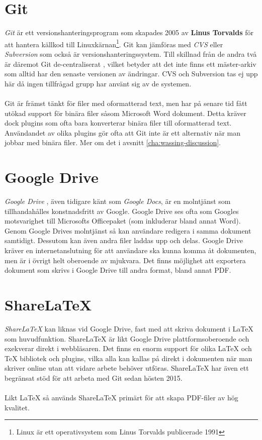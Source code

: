\section{Git}
\label{sec:wassing-git}
\textit{Git} \cite{website:git} är ett versionshanteringsprogram \cite{website:git_version_control} som skapades 2005 av \textbf{Linus Torvalds} för att hantera källkod till Linuxkärnan\footnote{Linux är ett operativsystem som Linus Torvalds publicerade 1991}. Git kan jämföras med \textit{CVS} eller \textit{Subversion} som också är versionshanteringssystem. Till skillnad från de andra två är däremot Git de-centraliserat \cite{website:centralized_version_control}, vilket betyder att det inte finns ett mäster-arkiv som alltid har den senaste versionen av ändringar. CVS och Subversion tas ej upp här då ingen tillfrågad grupp har använt sig av de systemen.
\\ \\
Git är främst tänkt för filer med oformatterad text, men har på senare tid fått utökad support för binära filer såsom Microsoft Word dokument. Detta kräver dock plugins som ofta bara konverterar binära filer till oformatterad text. \cite{website:using_git_with_word} Användandet av olika plugins gör ofta att Git inte är ett alternativ när man jobbar med binära filer. Mer om det i avsnitt \ref{cha:wassing-discussion}.

\section{Google Drive}
\textit{Google Drive} \cite{website:googledrive}, även tidigare känt som \textit{Google Docs}, är en molntjänst som tillhandahålles konstnadsfritt av Google. Google Drive ses ofta som Googles motsvarighet till Microsofts Officepaket (som inkluderar bland annat Word). Genom Google Drives molntjänst så kan användare redigera i samma dokument samtidigt. Dessutom kan även andra filer laddas upp och delas. Google Drive kräver en internetanslutning för att användare ska kunna komma åt dokumenten, men är i övrigt helt oberoende av mjukvara. Det finns möjlighet att exportera dokument som skrivs i Google Drive till andra format, bland annat PDF.

\section{ShareLaTeX}
\textit{ShareLaTeX} \cite{website:sharelatex} kan liknas vid Google Drive, fast med att skriva dokument i LaTeX som huvudfunktion. ShareLaTeX  är likt Google Drive plattformsoberoende och exekverar direkt i webbläsaren. Det finns en enorm support för olika LaTeX och TeX bibliotek och plugins, vilka alla kan kallas på direkt i dokumenten när man skriver online utan att vidare arbete behöver utföras. ShareLaTeX har även ett begränsat stöd för att arbeta med Git sedan hösten 2015.
\\ \\
Likt LaTeX så används ShareLaTeX primärt för att skapa PDF-filer av hög kvalitet.

